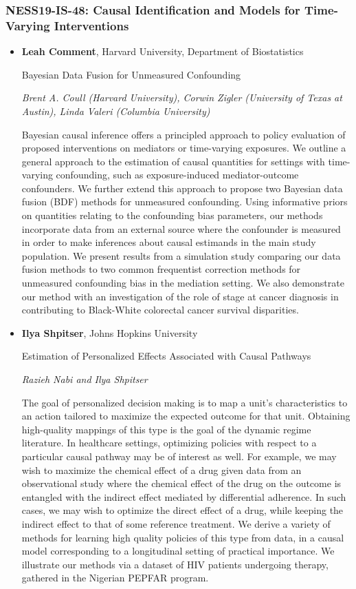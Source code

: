 \subsubsection*{NESS19-IS-48: Causal Identification and Models for Time-Varying Interventions}

\begin{itemize}
\item \textbf{Leah Comment}, Harvard University, Department of Biostatistics

Bayesian Data Fusion for Unmeasured Confounding

\emph{\footnotesize Brent A. Coull (Harvard University), Corwin Zigler (University of Texas at Austin), Linda Valeri (Columbia University)}

Bayesian causal inference offers a principled approach to policy evaluation of proposed interventions on mediators or time-varying exposures. We outline a general approach to the estimation of causal quantities for settings with time-varying confounding, such as exposure-induced mediator-outcome confounders. We further extend this approach to propose two Bayesian data fusion (BDF) methods for unmeasured confounding. Using informative priors on quantities relating to the confounding bias parameters, our methods incorporate data from an external source where the confounder is measured in order to make inferences about causal estimands in the main study population. We present results from a simulation study comparing our data fusion methods to two common frequentist correction methods for unmeasured confounding bias in the mediation setting. We also demonstrate our method with an investigation of the role of stage at cancer diagnosis in contributing to Black-White colorectal cancer survival disparities.

\item \textbf{Ilya Shpitser}, Johns Hopkins University

Estimation of Personalized Effects Associated with Causal Pathways

\emph{\footnotesize Razieh Nabi and Ilya Shpitser}

The goal of personalized decision making is to map a unit’s characteristics to an action tailored to maximize the expected outcome for that unit. Obtaining high-quality mappings of this type is the goal of the dynamic regime literature. In healthcare settings, optimizing policies with respect to a particular causal pathway may be of interest as well. For example, we may wish to maximize the chemical effect of a drug given data from an observational study where the chemical effect of the drug on the outcome is entangled with the indirect effect mediated by differential adherence. In such cases, we may wish to optimize the direct effect of a drug, while keeping the indirect effect to that of some reference treatment. We derive a variety of methods for learning high quality policies of this type from data, in a causal model corresponding to a longitudinal setting of practical importance. We illustrate our methods via a dataset of HIV patients undergoing therapy, gathered in the Nigerian PEPFAR program.



\end{itemize}
